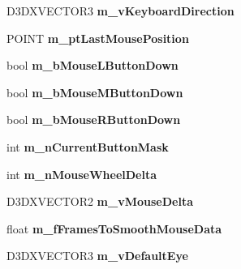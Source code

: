 \begin{DoxyCompactItemize}
\item 
\hypertarget{class_c_base_camera_aed43d3466c7a2d60b7b62845ab602b6f}{D3\+D\+X\+V\+E\+C\+T\+O\+R3 {\bfseries m\+\_\+v\+Keyboard\+Direction}}\label{class_c_base_camera_aed43d3466c7a2d60b7b62845ab602b6f}

\item 
\hypertarget{class_c_base_camera_a6019b5ba50a3e7c57187d8341292c7d2}{P\+O\+I\+N\+T {\bfseries m\+\_\+pt\+Last\+Mouse\+Position}}\label{class_c_base_camera_a6019b5ba50a3e7c57187d8341292c7d2}

\item 
\hypertarget{class_c_base_camera_a328bd336893fea3959fafeb2938bc426}{bool {\bfseries m\+\_\+b\+Mouse\+L\+Button\+Down}}\label{class_c_base_camera_a328bd336893fea3959fafeb2938bc426}

\item 
\hypertarget{class_c_base_camera_a1b56edb22dc3c1383da3524211dcfa6f}{bool {\bfseries m\+\_\+b\+Mouse\+M\+Button\+Down}}\label{class_c_base_camera_a1b56edb22dc3c1383da3524211dcfa6f}

\item 
\hypertarget{class_c_base_camera_aeed297c389f73cae17eb0b923aa0092e}{bool {\bfseries m\+\_\+b\+Mouse\+R\+Button\+Down}}\label{class_c_base_camera_aeed297c389f73cae17eb0b923aa0092e}

\item 
\hypertarget{class_c_base_camera_aa30c8f1421c0e0f00dd1b3b37165bffd}{int {\bfseries m\+\_\+n\+Current\+Button\+Mask}}\label{class_c_base_camera_aa30c8f1421c0e0f00dd1b3b37165bffd}

\item 
\hypertarget{class_c_base_camera_ae6f0a643e814c30ae8f8fe7d8e49c46e}{int {\bfseries m\+\_\+n\+Mouse\+Wheel\+Delta}}\label{class_c_base_camera_ae6f0a643e814c30ae8f8fe7d8e49c46e}

\item 
\hypertarget{class_c_base_camera_ab884ec4d7972fed1319ed867a542f041}{D3\+D\+X\+V\+E\+C\+T\+O\+R2 {\bfseries m\+\_\+v\+Mouse\+Delta}}\label{class_c_base_camera_ab884ec4d7972fed1319ed867a542f041}

\item 
\hypertarget{class_c_base_camera_af9b4d43933754929e66403e0435d6387}{float {\bfseries m\+\_\+f\+Frames\+To\+Smooth\+Mouse\+Data}}\label{class_c_base_camera_af9b4d43933754929e66403e0435d6387}

\item 
\hypertarget{class_c_base_camera_a71147e92520e8965eac70517585ffe3c}{D3\+D\+X\+V\+E\+C\+T\+O\+R3 {\bfseries m\+\_\+v\+Default\+Eye}}\label{class_c_base_camera_a71147e92520e8965eac70517585ffe3c}


\end{DoxyCompactItemize}
